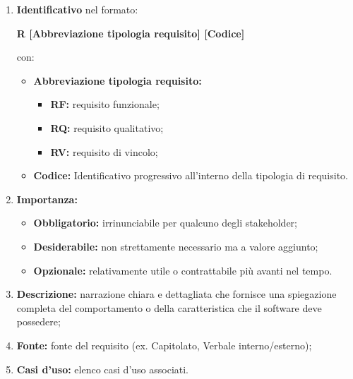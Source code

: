 \begin{enumerate}
    \item \textbf{Identificativo} nel formato:\\
          \begin{center}
              \textbf{R [Abbreviazione tipologia requisito] [Codice]}
          \end{center}
          con:
          \begin{itemize}
              \item \textbf{Abbreviazione tipologia requisito:}
                    \begin{itemize}
                        \item \textbf{RF:} requisito funzionale;
                        \item \textbf{RQ:} requisito qualitativo;
                        \item \textbf{RV:} requisito di vincolo;
                    \end{itemize}
              \item \textbf{Codice:} Identificativo progressivo all'interno della tipologia di requisito.
          \end{itemize}
    \item \textbf{Importanza:}
          \begin{itemize}
              \item \textbf{Obbligatorio:} irrinunciabile per qualcuno degli stakeholder;
              \item \textbf{Desiderabile:} non strettamente necessario ma a valore aggiunto;
              \item \textbf{Opzionale:} relativamente utile o contrattabile più avanti nel tempo.
          \end{itemize}
    \item \textbf{Descrizione:} narrazione chiara e dettagliata che fornisce una spiegazione completa del comportamento o della caratteristica che il software deve possedere;
    \item \textbf{Fonte:} fonte del requisito (ex. Capitolato, Verbale interno/esterno);
    \item \textbf{Casi d'uso:} elenco casi d'uso associati.
\end{enumerate}
